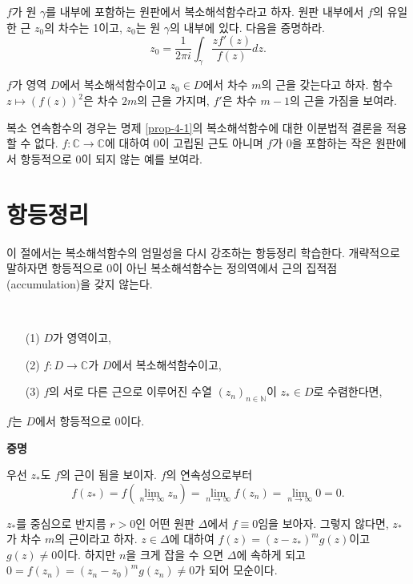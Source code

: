 \begin{salt_exercise} \label{ex-4-19}
$f$가 원 $\gamma$를 내부에 포함하는 원판에서 복소해석함수라고 하자.
원판 내부에서 $f$의 유일한 근 $z_0$의 차수는 1이고,
$z_0$는 원 $\gamma$의 내부에 있다.
다음을 증명하라.
\[
z_0 = \dfrac1{2\pi i} \int_\gamma \dfrac{zf'(z)}{f(z)} dz.
\]
\end{salt_exercise}

\begin{salt_exercise} \label{ex-4-20}
$f$가 영역 $D$에서 복소해석함수이고 $z_0\in D$에서
차수 $m$의 근을 갖는다고 하자.
함수 $z \mapsto (f(z))^2$은 차수 $2m$의 근을 가지며,
$f'$은 차수 $m-1$의 근을 가짐을 보여라.
\end{salt_exercise}

\begin{salt_exercise} \label{ex-4-21}
복소 연속함수의 경우는 명제 \ref{prop-4-1}의 복소해석함수에 대한
이분법적 결론을 적용할 수 없다. 
$f:\mathbb C \to \mathbb C$에 대하여 
$0$이  고립된 근도 아니며 $f$가 $0$을 포함하는 작은 원판에서  
항등적으로 $0$이 되지 않는 예를 보여라.
\end{salt_exercise}

\section{항등정리}

이 절에서는 복소해석함수의 엄밀성을 다시 강조하는 항등정리 학습한다.
개략적으로 말하자면
항등적으로 $0$이 아닌 복소해석함수는 정의역에서 근의 집적점(accumulation)을 갖지 않는다.

\begin{salt_theorem} \label{thm-4-5}
\
\begin{itemize}
\item[(1)] $D$가 영역이고,
\item[(2)] $f:D\to\mathbb C$가 $D$에서 복소해석함수이고,
\item[(3)] $f$의 서로 다른 근으로 이루어진 수열 $(z_n)_{n\in\mathbb N}$이 $z_*\in D$로 수렴한다면,
\end{itemize}
$f$는 $D$에서 항등적으로 $0$이다.
\end{salt_theorem}

{\bf 증명}

우선 $z_*$도 $f$의 근이 됨을 보이자.
$f$의 연속성으로부터
\[
f(z_*) = f\left(\lim_{n\to\infty} z_n \right) = \lim_{n\to\infty}f( z_n) 
= \lim_{n\to\infty} 0 = 0.
\]

$z_*$를 중심으로 반지름 $r>0$인 어떤 원판 $\Delta$에서 $f\equiv0$임을 보아자.
그렇지 않다면, $z_*$가 차수 $m$의 근이라고 하자.
$z\in \Delta$에 대하여
$f(z)=(z-z_*)^mg(z)$이고 $g(z)\ne0$이다.
하지만 $n$을 크게 잡을 수 으면 $\Delta$에 속하게 되고
$0 = f(z_n) = (z_n-z_0)^m g(z_n) \ne 0$가 되어 모순이다.


